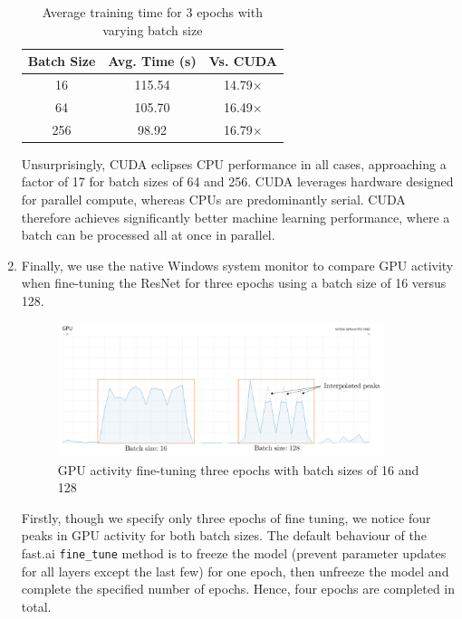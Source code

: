 \begin{enumerate}[label=\alph*)]
    \begin{table}[ht]
        \small \centering {}
        \caption{Average training time for 3 epochs with varying batch size}
        \begin{tabularx}{0.48\textwidth}{c c c}
            \toprule
            \textbf{Batch Size} & \textbf{Avg. Time (s)} & \textbf{Vs. CUDA} \\
            \midrule
             16 & 115.54 & 14.79$\times$ \\
             64 & 105.70 & 16.49$\times$ \\
            256 &  98.92 & 16.79$\times$ \\
            \bottomrule
        \end{tabularx}
        \label{tab:bs_exp_cpu}
    \end{table}

    Unsurprisingly, CUDA eclipses CPU performance in all cases, approaching a factor of 17 for batch sizes of 64 and 256. CUDA leverages hardware designed for parallel compute, whereas CPUs are predominantly serial. CUDA therefore achieves significantly better machine learning performance, where a batch can be processed all at once in parallel.

\newpage

    \item Finally, we use the native Windows system monitor to compare GPU activity when fine-tuning the ResNet for three epochs using a batch size of 16 versus 128.

    \begin{figure}[ht]
        \centering
        \includegraphics[width=0.9\textwidth]{images/q8_gpumon.png}
        \caption{GPU activity fine-tuning three epochs with batch sizes of 16 and 128}
        \label{fig:q8_gpumon}
    \end{figure}

    Firstly, though we specify only three epochs of fine tuning, we notice four peaks in GPU activity for both batch sizes. The default behaviour of the fast.ai \texttt{fine\_tune} method is to freeze the model (prevent parameter updates for all layers except the last few) for one epoch, then unfreeze the model and complete the specified number of epochs. Hence, four epochs are completed in total.


\end{enumerate}
